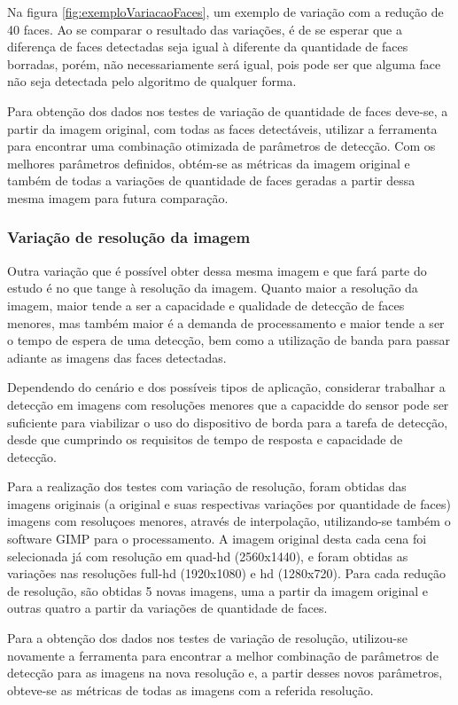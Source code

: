 Na figura \ref{fig:exemploVariacaoFaces}, um exemplo de variação com a redução de 40 faces. Ao se comparar o resultado das variações, é de se esperar que a diferença de faces detectadas seja igual à diferente da quantidade de faces borradas, porém, não necessariamente será igual, pois pode ser que alguma face não seja detectada pelo algoritmo de qualquer forma.

Para obtenção dos dados nos testes de variação de quantidade de faces deve-se, a partir da imagem original, com todas as faces detectáveis, utilizar a ferramenta para encontrar uma combinação otimizada de parâmetros de detecção. Com os melhores parâmetros definidos, obtém-se as métricas da imagem original e também de todas a variações de quantidade de faces geradas a partir dessa mesma imagem para futura comparação.

\subsubsection{Variação de resolução da imagem}

Outra variação que é possível obter dessa mesma imagem e que fará parte do estudo é no que tange à resolução da imagem. Quanto maior a resolução da imagem, maior tende a ser a capacidade e qualidade de detecção de faces menores, mas também maior é a demanda de processamento e maior tende a ser o tempo de espera de uma detecção, bem como a utilização de banda para passar adiante as imagens das faces detectadas.

Dependendo do cenário e dos possíveis tipos de aplicação, considerar trabalhar a detecção em imagens com resoluções menores que a capacidde do sensor pode ser suficiente para viabilizar o uso do dispositivo de borda para a tarefa de detecção, desde que cumprindo os requisitos de tempo de resposta e capacidade de detecção.

Para a realização dos testes com variação de resolução, foram obtidas das imagens originais (a original e suas respectivas variações por quantidade de faces) imagens com resoluçoes menores, através de interpolação, utilizando-se também o software GIMP para o processamento. A imagem original desta cada cena foi selecionada já com resolução em quad-hd (2560x1440), e foram obtidas as variações nas resoluções full-hd (1920x1080) e hd (1280x720). Para cada redução de resolução, são obtidas 5 novas imagens, uma a partir da imagem original e outras quatro a partir da variações de quantidade de faces.

Para a obtenção dos dados nos testes de variação de resolução, utilizou-se novamente a ferramenta para encontrar a melhor combinação de parâmetros de detecção para as imagens na nova resolução e, a partir desses novos parâmetros, obteve-se as métricas de todas as imagens com a referida resolução.

